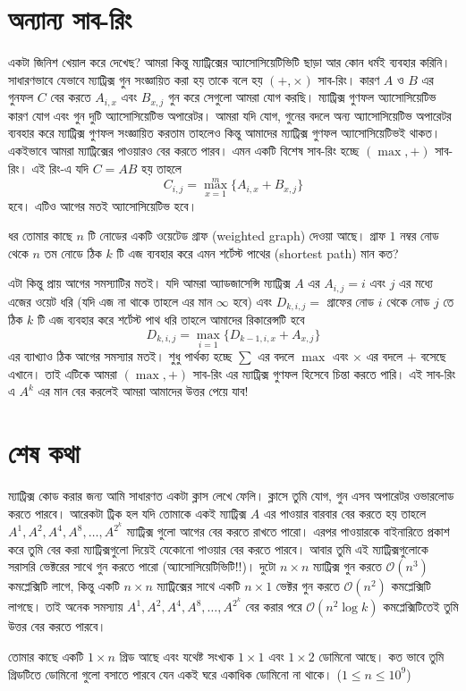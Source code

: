 \section{অন্যান্য সাব-রিং}
একটা জিনিশ খেয়াল করে দেখেছ? আমরা কিন্তু ম্যাট্রিক্সের অ্যাসোসিয়েটিভিটি ছাড়া আর কোন ধর্মই ব্যবহার করিনি। সাধারণভাবে যেভাবে ম্যাট্রিক্স গুন সংজ্ঞায়িত করা হয় তাকে বলে হয় $(+, \times)$ সাব-রিং। কারণ  $A$ ও $B$ এর গুনফল $C$ বের করতে $A_{i, x}$ এবং $B_{x, j}$ গুন করে সেগুলো আমরা যোগ করছি। ম্যাট্রিক্স গুণফল  অ্যাসোসিয়েটিভ কারণ যোগ এবং গুন দুটি অ্যাসোসিয়েটিভ অপারেটর। আমরা যদি যোগ, গুনের বদলে অন্য অ্যাসোসিয়েটিভ অপারেটর ব্যবহার করে ম্যাট্রিক্স গুণফল সংজ্ঞায়িত করতাম তাহলেও কিন্তু আমাদের ম্যাট্রিক্স গুণফল অ্যাসোসিয়েটিভই থাকত। একইভাবে আমরা ম্যাট্রিক্সের পাওয়ারও বের করতে পারব। এমন একটি বিশেষ সাব-রিং হচ্ছে $(\max, +)$ সাব-রিং। এই রিং-এ যদি $C = AB$ হয় তাহলে 
$$C_{i, j} = \max_{x = 1}^m \lbrace A_{i, x} + B_{x, j} \rbrace$$
হবে। এটিও আগের মতই অ্যাসোসিয়েটিভ হবে। 
\begin{problem}
ধর তোমার কাছে $n$ টি নোডের একটি ওয়েটেড গ্রাফ (weighted graph) দেওয়া আছে। গ্রাফ $1$ নম্বর নোড থেকে $n$ তম নোডে ঠিক $k$ টি এজ ব্যবহার করে এমন শর্টেস্ট পাথের (shortest path) মান কত?  
\end{problem}
\begin{solution}
এটা কিন্তু প্রায় আগের সমস্যাটির মতই। যদি আমরা অ্যাডজাসেন্সি ম্যাট্রিক্স $A$ এর $A_{i, j} = i$ এবং $j$ এর মধ্যে এজের ওয়েট ধরি (যদি এজ না থাকে তাহলে এর মান $\infty$ হবে) এবং  $D_{k, i, j} = $ গ্রাফের নোড $i$ থেকে নোড $j$ তে ঠিক $k$ টি এজ ব্যবহার করে শর্টেস্ট পাথ ধরি তাহলে আমাদের রিকারেন্সটি হবে 
$$ D_{k, i, j} = \max_{i = 1} \lbrace D_{k - 1, i, x} + A_{x, j} \rbrace$$
এর ব্যাখ্যাও ঠিক আগের সমস্যার মতই। শুধু পার্থক্য হচ্ছে $\sum$ এর বদলে $\max$ এবং $\times$ এর বদলে $+$ বসেছে এখানে। তাই এটিকে আমরা $(\max, +)$ সাব-রিং এর ম্যাট্রিক্স গুণফল হিসেবে চিন্তা করতে পারি। এই সাব-রিং এ $A^{k}$ এর মান বের করলেই আমরা আমাদের উত্তর পেয়ে যাব!
\end{solution}

\section{শেষ কথা}
ম্যাট্রিক্স কোড করার জন্য আমি সাধারণত একটা ক্লাস লেখে ফেলি। ক্লাসে তুমি যোগ, গুন এসব অপারেটর ওভারলোড করতে পারবে। আরেকটা ট্রিক হল যদি তোমাকে একই ম্যাট্রিক্স $A$ এর পাওয়ার বারবার বের করতে হয় তাহলে $A^1, A^2, A^4, A^8, \dots, A^{2^k}$ ম্যাট্রিক্স গুলো আগের বের করতে রাখতে পারো। এরপর পাওয়ারকে বাইনারিতে প্রকাশ করে তুমি বের করা ম্যাট্রিক্সগুলো দিয়েই যেকোনো পাওয়ার বের করতে পারবে। আবার তুমি এই ম্যাট্রিক্সগুলোকে সরাসরি ভেক্টরের সাথে গুন করতে পারো (অ্যাসোসিয়েটিভিটি!!)।  দুটো $n \times n$ ম্যাট্রিক্স গুন করতে $\mathcal{O}(n^3)$ কমপ্লেক্সিটি লাগে, কিন্তু একটি $n \times n$ ম্যাট্রিক্সের সাথে একটি $n \times 1$ ভেক্টর গুন করতে $\mathcal{O}(n^2)$ কমপ্লেক্সিটি লাগছে। তাই অনেক সমস্যায় $A^1, A^2, A^4, A^8, \dots, A^{2^k}$ বের করার পরে $\mathcal{O}(n^2 \log{k})$ কমপ্লেক্সিটিতেই তুমি উত্তর বের করতে পারবে। 

\begin{diybox}
তোমার কাছে একটি $1 \times n$ গ্রিড আছে এবং যথেষ্ট সংখ্যক $1 \times 1$ এবং $1 \times 2$ ডোমিনো আছে। কত ভাবে তুমি গ্রিডটিতে ডোমিনো গুলো বসাতে পারবে যেন একই ঘরে একাধিক ডোমিনো না থাকে। ($1 \leq n \leq 10^{9}$)
\end{diybox}



